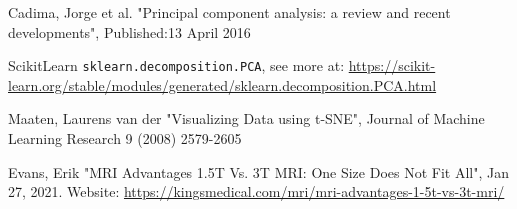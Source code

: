 \documentclass[12pt, fleqn, titlepage]{article}
\newcommand{\1}[1]{\mathds{1}\left[#1\right]}
\begin{document}
\begin{thebibliography}{9}
		 Cadima, Jorge et al. "Principal component analysis: a review and recent developments", Published:13 April 2016
		
		 ScikitLearn \texttt{sklearn.decomposition.PCA}, see more at: \url{https://scikit-learn.org/stable/modules/generated/sklearn.decomposition.PCA.html}
		
		 Maaten, Laurens van der "Visualizing Data using t-SNE", Journal of Machine Learning Research 9 (2008) 2579-2605 
		
		 Evans, Erik "MRI Advantages 1.5T Vs. 3T MRI: One Size Does Not Fit All", Jan 27, 2021. Website: \url{https://kingsmedical.com/mri/mri-advantages-1-5t-vs-3t-mri/}
		
		
	\end{thebibliography}
	
	
	\newpage
	
	
	
	
	
	
	
	
	
	
	
\end{document}
